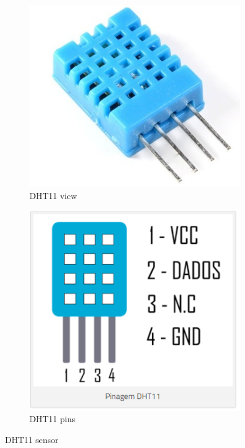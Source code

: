 \begin{figure}[h]
\centering

    \begin{subfigure}[b]{0.2\textwidth}
		\includegraphics[width=\textwidth]{figs/dht11}
		\caption{DHT11 view}
		\label{fig-dht11}
    \end{subfigure}
    \begin{subfigure}[b]{0.2\textwidth}
	\includegraphics[width=\textwidth]{figs/dht11-pinagem}
	\caption{DHT11 pins}
	\label{fig-dht11-1}
    \end{subfigure}
	\caption{DHT11 sensor}
\end{figure}

